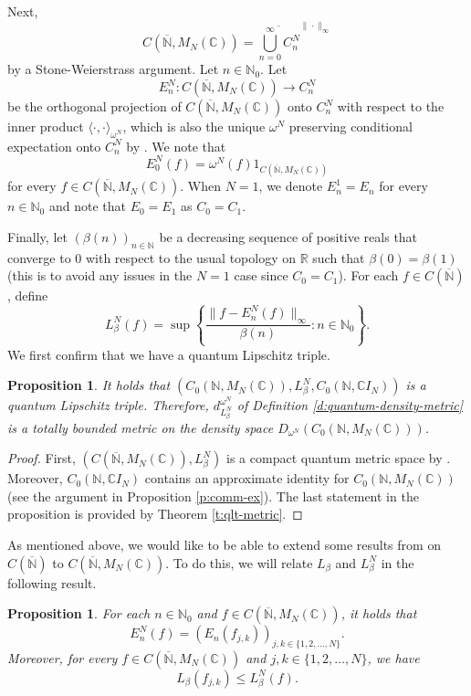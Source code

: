 \documentclass{amsart}
\theoremstyle{plain}
\newtheorem{proposition}[theorem]{Proposition}
\theoremstyle{definition}
\theoremstyle{remark}
\numberwithin{equation}{section}
\newcommand{\be}{{\beta}}
\newcommand{\om}{{\omega}}
\newcommand{\N}{{\mathds{N}}}
\newcommand{\R}{{\mathds{R}}}
\newcommand{\C}{{\mathds{C}}}
\renewcommand{\leq}{\leqslant}
\begin{document}
Next,
\[
C(\overline{\N}, M_N(\C))=\overline{\bigcup_{n=0}^\infty C_n^N}^{\|\cdot\|_\infty}
\]
by a Stone-Weierstrass argument. 
Let $n\in \N_0$. Let
\[
E^N_n : C(\overline{\N}, M_N(\C)) \rightarrow C^N_n
\]
be the orthogonal projection of $ C(\overline{\N}, M_N(\C)) $ onto $C_n^N$ with respect to the inner product $\langle \cdot, \cdot \rangle_{\omega^N} $, which is also the unique $\om^N$ preserving conditional expectation onto $C_n^N$ by \cite[Theorem 3.5 and Expression (4.1)]{Aguilar-Latremoliere15}. We note that 
\[
E^N_0(f)=\omega^N(f)1_{C(\overline{\N}, M_N(\C))}
\]  
for every $f\in C(\overline{\N}, M_N(\C))$. When $N=1$, we denote $E^1_n=E_n$ for every $n\in \N_0$ and note that $E_0=E_1$ as $C_0=C_1$.  


Finally, let $(\beta(n))_{n\in \N}$ be a decreasing sequence of positive reals that converge to $0$ with respect to the usual topology on $\R$ such that $\be(0)=\be(1)$ (this is to avoid any issues in the $N=1$ case since  $C_0=C_1$). For each $f\in C(\overline{\N})$, define
\[
L^N_\beta(f)=\sup \left\{\frac{\|f-E^N_n(f)\|_\infty}{\beta(n)}: n\in \N_0 \right\}.
\]
We first confirm that we have a quantum Lipschitz triple.
\begin{proposition}
It holds that $(C_0(\N, M_N(\C)), L^N_\beta, C_0(\N, \C I_N))$ is a quantum Lipschitz triple.    Therefore, $d_{L^N_\be}^{\om^N}$ of Definition \ref{d:quantum-density-metric} is a totally bounded metric on the density space $D_{\om^N}(C_0(\N, M_N(\C)))$. 
\end{proposition}
\begin{proof}
     First,   $(C(\overline{\N}, M_N(\C)), L_\be^N)$ is a compact quantum metric space by \cite[Theorem 3.5]{Aguilar-Latremoliere15}. Moreover, $C_0(\N, \C I_N) $ contains an approximate identity for $C_0(\N, M_N(\C))$ (see the argument in Proposition \ref{p:comm-ex}). The last statement in the proposition is provided  by Theorem \ref{t:qlt-metric}.
\end{proof}
As mentioned above, we would like to be able to extend some results from \cite{Aguilar-vBH-L} on $C(\overline{\N})$ to $C(\overline{\N}, M_N(\C))$. To do this, we will relate $L_\be$ and $L_\be^N$ in the following result.
\begin{proposition}\label{p:amplified-cond-exp}
    For each  $n\in \N_0$ and $f\in C(\overline{\N}, M_N(\C))$, it holds that
    \[
    E_n^N(f)=(E_n(f_{j,k}))_{j,k\in \{1,2,\ldots, N\}}.
    \]
    Moreover, for every $f\in C(\overline{\N}, M_N(\C)) $ and $j,k\in \{1,2,\ldots, N\}$, we have 
    \[
    L_\be(f_{j,k})\leq L_\be^N(f).
    \]
\end{proposition}
\end{document}
